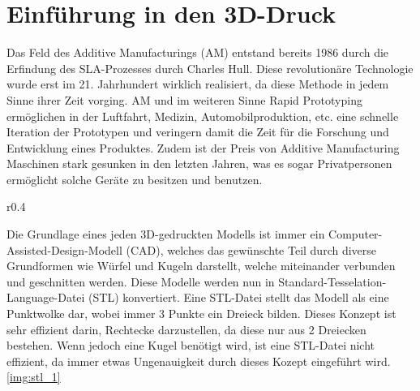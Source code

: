 \documentclass[main.tex]{subfiles}
\begin{document}
\section{Einführung in den 3D-Druck}

Das Feld des Additive Manufacturings (AM) entstand bereits 1986 durch die Erfindung des SLA-Prozesses durch Charles Hull. 
Diese revolutionäre Technologie wurde erst im 21. Jahrhundert wirklich realisiert, da diese Methode in jedem Sinne ihrer Zeit vorging. AM und im weiteren Sinne Rapid Prototyping ermöglichen in der Luftfahrt, Medizin, Automobilproduktion, etc. eine schnelle Iteration der Prototypen und veringern damit die Zeit für die Forschung und Entwicklung eines Produktes. 
Zudem ist der Preis von Additive Manufacturing Maschinen stark gesunken in den letzten Jahren, was es sogar Privatpersonen ermöglicht solche Geräte zu besitzen und benutzen. \parencite{BHATIA20231060}

\begin{wrapfigure}{r}{0.4\textwidth}
	
	\caption{Wiremesh eines Würfels und einer Kugel als STL-Datei}
	\label{img:stl_1}
\end{wrapfigure}
Die Grundlage eines jeden 3D-gedruckten Modells ist immer ein Computer-Assisted-Design-Modell (CAD), welches das gewünschte Teil durch diverse Grundformen wie Würfel und Kugeln darstellt, welche miteinander verbunden und geschnitten werden. Diese Modelle werden nun in Standard-Tesselation-Language-Datei (STL) konvertiert. Eine STL-Datei stellt das Modell als eine Punktwolke dar, wobei immer 3 Punkte ein Dreieck bilden. Dieses Konzept ist sehr effizient darin, Rechtecke darzustellen, da diese nur aus 2 Dreiecken bestehen. Wenn jedoch eine Kugel benötigt wird, ist eine STL-Datei nicht effizient, da immer etwas Ungenauigkeit durch dieses Kozept eingeführt wird. \ref{img:stl_1}
	
\end{document}
